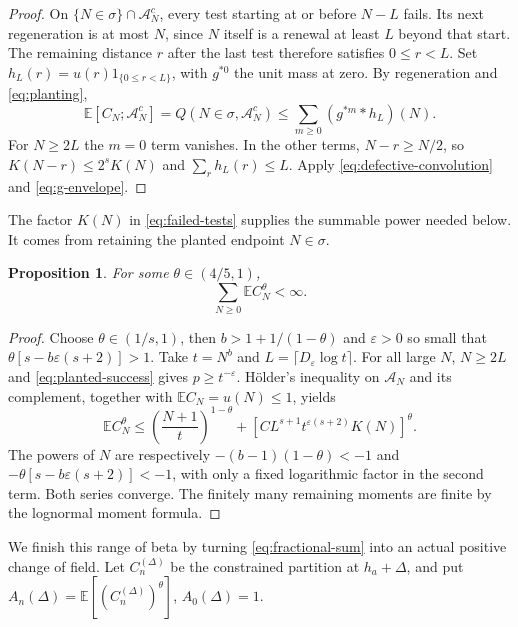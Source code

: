\documentclass[11pt]{article}
\newtheorem{proposition}[proposition]{Proposition}
\theoremstyle{remark}
\numberwithin{equation}{section}
\newcommand{\E}{\mathbb E}
\begin{document}
\begin{proof}
On $\{N\in\sigma\}\cap\mathcal A_N^c$, every test starting at or
before $N-L$ fails. Its next regeneration is at most $N$, since $N$ itself
is a renewal at least $L$ beyond that start. The remaining distance $r$ after
the last test therefore satisfies $0\le r<L$. Set
$h_L(r)=u(r)1_{\{0\le r<L\}}$, with $g^{*0}$ the unit mass at zero.
By regeneration and \eqref{eq:planting},
\[
 \E[C_N;\mathcal A_N^c]=Q(N\in\sigma,\mathcal A_N^c)
 \le\sum_{m\ge0}(g^{*m}*h_L)(N).
\]
For $N\ge2L$ the $m=0$ term vanishes. In the other terms,
$N-r\ge N/2$, so $K(N-r)\le2^sK(N)$ and $\sum_rh_L(r)\le L$.
Apply \eqref{eq:defective-convolution} and \eqref{eq:g-envelope}.
\end{proof}

The factor $K(N)$ in \eqref{eq:failed-tests} supplies the summable power
needed below. It comes from retaining the planted endpoint $N\in\sigma$.

\begin{proposition}\label{prop:fractional-sum}
For some $\theta\in(4/5,1)$,
\begin{equation}\label{eq:fractional-sum}
 \sum_{N\ge0}\E C_N^\theta<\infty.
\end{equation}
\end{proposition}
\begin{proof}
Choose $\theta\in(1/s,1)$, then $b>1+1/(1-\theta)$ and
$\varepsilon>0$ so small that $\theta[s-b\varepsilon(s+2)]>1$.
Take $t=N^b$ and $L=\lceil D_\varepsilon\log t\rceil$. For all large
$N$, $N\ge2L$ and \eqref{eq:planted-success} gives $p\ge t^{-\varepsilon}$.
H\"older's inequality on $\mathcal A_N$ and its complement, together with
$\E C_N=u(N)\le1$, yields
\begin{equation}\label{eq:frac-bound}
 \E C_N^\theta\le
 \left(\frac{N+1}{t}\right)^{1-\theta}
 +\left[C L^{s+1}t^{\varepsilon(s+2)}K(N)\right]^\theta.
\end{equation}
The powers of $N$ are respectively $-(b-1)(1-\theta)<-1$ and
$-\theta[s-b\varepsilon(s+2)]<-1$, with only a fixed logarithmic factor
in the second term. Both series converge. The finitely many remaining
moments are finite by the lognormal moment formula.
\end{proof}

We finish this range of beta by turning \eqref{eq:fractional-sum} into an
actual positive change of field. Let $C_n^{(\Delta)}$ be the constrained
partition at $h_a+\Delta$, and put
$A_n(\Delta)=\E[(C_n^{(\Delta)})^\theta]$, $A_0(\Delta)=1$.
\end{document}
